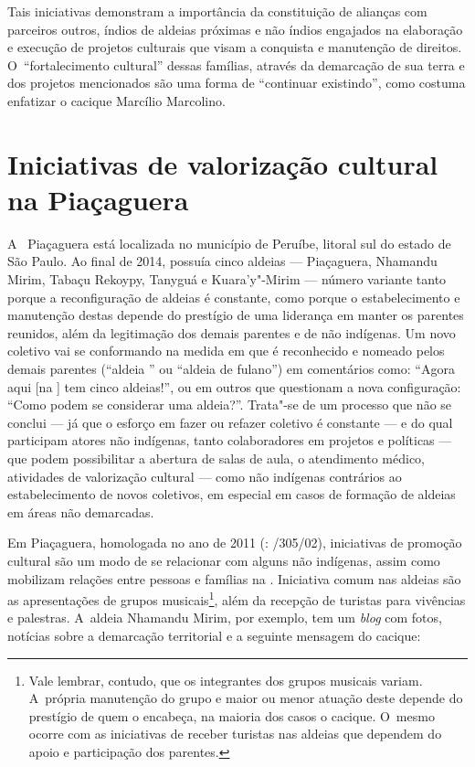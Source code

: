 Tais iniciativas demonstram a importância da constituição de alianças
com parceiros outros, índios de aldeias próximas e não índios engajados
na elaboração e execução de projetos culturais que visam a conquista e
manutenção de direitos. O~``fortalecimento cultural'' dessas famílias,
através da demarcação de sua terra e dos projetos mencionados são uma
forma de ``continuar existindo'', como costuma enfatizar o cacique Marcílio
Marcolino. 

\section{Iniciativas de valorização cultural na  Piaçaguera}

A~ Piaçaguera está localizada no município de Peruíbe, litoral sul do
estado de São Paulo. Ao final de 2014, possuía cinco aldeias ---
Piaçaguera, Nhamandu Mirim, Tabaçu Rekoypy, Tanyguá e Kuara’y"-Mirim ---
número variante tanto porque a reconfiguração de aldeias é constante,
como porque o estabelecimento e manutenção destas depende do prestígio
de uma liderança em manter os parentes reunidos, além da legitimação
dos demais parentes e de não indígenas. Um novo coletivo vai se
conformando na medida em que é reconhecido e nomeado pelos demais
parentes (``aldeia '' ou ``aldeia de fulano'') em comentários como: ``Agora
aqui [na ] tem cinco aldeias!'', ou em outros que questionam a nova
configuração: ``Como podem se considerar uma aldeia?''. Trata"-se de um
processo que não se conclui --- já que o esforço em fazer ou refazer
coletivo é constante --- e do qual participam atores não indígenas, tanto
colaboradores em projetos e políticas --- que podem possibilitar a
abertura de salas de aula, o atendimento médico, atividades de
valorização cultural --- como não indígenas contrários ao estabelecimento
de novos coletivos, em especial em casos de formação de aldeias em
áreas não demarcadas. 

Em Piaçaguera,  homologada no ano de 2011 (: /305/02),
iniciativas de promoção cultural são um modo de se relacionar com
alguns não indígenas, assim como mobilizam relações entre pessoas e
famílias na . Iniciativa comum nas aldeias são as apresentações de
grupos musicais\footnote{Vale lembrar, contudo, que os integrantes dos
grupos musicais variam. A~própria manutenção do grupo e maior ou menor
atuação deste depende do prestígio de quem o encabeça, na maioria dos
casos o cacique. O~mesmo ocorre com as iniciativas de receber turistas
nas aldeias que dependem do apoio e participação dos parentes.}, além
da recepção de turistas para vivências e palestras. A~aldeia Nhamandu
Mirim, por exemplo, tem um \emph{blog} com fotos, notícias sobre a demarcação
territorial e a seguinte mensagem do cacique:

